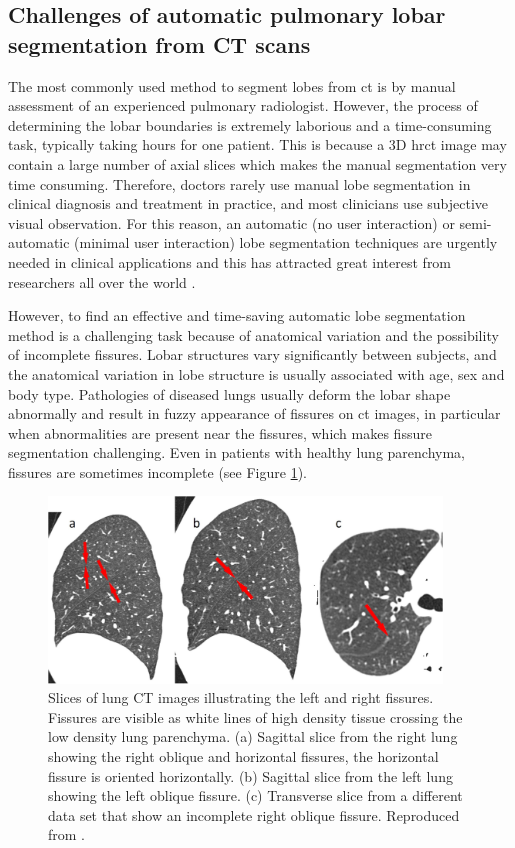 \subsection{Challenges of automatic pulmonary lobar segmentation from CT scans} \label{SegmentationChallenge}
The most commonly used method to segment lobes from \gls{ct} is by manual assessment of an experienced pulmonary radiologist. However, the process of determining the lobar boundaries is extremely laborious and a time-consuming task, typically taking hours for one patient. This is because a 3D \gls{hrct} image may contain a large number of axial slices which makes the manual segmentation very time consuming. Therefore, doctors rarely use manual lobe segmentation in clinical diagnosis and treatment in practice, and most clinicians use subjective visual observation. For this reason, an automatic (no user interaction) or semi-automatic (minimal user interaction) lobe segmentation techniques are urgently needed in clinical applications and this has attracted great interest from researchers all over the world \citep{van2013automated,pu2009computational,ukil2009anatomy}.

However, to find an effective and time-saving automatic lobe segmentation method is a challenging task because of anatomical variation and the possibility of incomplete fissures. Lobar structures vary significantly between subjects, and the anatomical variation in lobe structure is usually associated with age, sex and body type. Pathologies of diseased lungs usually deform the lobar shape abnormally and result in fuzzy appearance of fissures on \gls{ct} images, in particular when abnormalities are present near the fissures, which makes fissure segmentation challenging. Even in patients with healthy lung parenchyma, fissures are sometimes incomplete \citep{gulsun2006variability, doel2015review} (see Figure \ref{fig:FissureSegmentationChanllenges}).

\begin{figure}[htbp]
  \centering 
  \includegraphics[height=1.95in]{Segmentation/Image/FissureSegmentationChanllenges.jpg}
  \caption{Slices of lung CT images illustrating the left and right fissures. Fissures are visible as white lines of high density tissue crossing the low density lung parenchyma. (a) Sagittal slice from the right lung showing the right oblique and horizontal fissures, the horizontal fissure is oriented horizontally. (b) Sagittal slice from the left lung showing the left oblique fissure. (c) Transverse slice from a different data set that show an incomplete right oblique fissure. Reproduced from \citep{ukil2009anatomy}.}
  \label{fig:FissureSegmentationChanllenges}
\end{figure}

